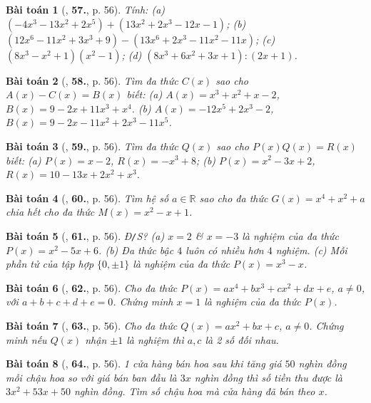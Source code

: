 \documentclass{article}
\numberwithin{equation}{section}
\newtheorem{baitoan}{Bài toán}
\begin{document}
\begin{baitoan}[\cite{SBT_Toan_7_Canh_Dieu_tap_2}, \textbf{57.}, p. 56]
	Tính: (a) $(-4x^3 - 13x^2 + 2x^5) + (13x^2 + 2x^3 - 12x - 1)$; (b) $(12x^6 - 11x^2 + 3x^3 + 9) - (13x^6 + 2x^3 - 11x^2 - 11x)$; (c) $(8x^3 - x^2 + 1)(x^2 - 1)$; (d) $(8x^3 + 6x^2 + 3x + 1):(2x + 1)$.
\end{baitoan}

\begin{baitoan}[\cite{SBT_Toan_7_Canh_Dieu_tap_2}, \textbf{58.}, p. 56]
	Tìm đa thức $C(x)$ sao cho $A(x) - C(x) = B(x)$ biết: (a) $A(x) = x^3 + x^2 + x - 2$, $B(x) = 9 - 2x + 11x^3 + x^4$. (b) $A(x) = -12x^5 + 2x^3 - 2$, $B(x) = 9 - 2x - 11x^2 + 2x^3 - 11x^5$.
\end{baitoan}

\begin{baitoan}[\cite{SBT_Toan_7_Canh_Dieu_tap_2}, \textbf{59.}, p. 56]
	Tìm đa thức $Q(x)$ sao cho $P(x)Q(x) = R(x)$ biết: (a) $P(x) = x - 2$, $R(x) = -x^3 + 8$; (b) $P(x) = x^2 - 3x + 2$, $R(x) = 10 - 13x + 2x^2 + x^3$.
\end{baitoan}

\begin{baitoan}[\cite{SBT_Toan_7_Canh_Dieu_tap_2}, \textbf{60.}, p. 56]
	Tìm hệ số $a\in\mathbb{R}$ sao cho đa thức $G(x) = x^4 + x^2 + a$ chia hết cho đa thức $M(x) = x^2 - x + 1$.
\end{baitoan}

\begin{baitoan}[\cite{SBT_Toan_7_Canh_Dieu_tap_2}, \textbf{61.}, p. 56]
	\emph{Đ\texttt{/}S?} (a) $x = 2$ \& $x = -3$ là nghiệm của đa thức $P(x) = x^2 - 5x + 6$. (b) Đa thức bậc $4$ luôn có nhiều hơn $4$ nghiệm. (c) Mỗi phần tử của tập hợp $\{0,\pm1\}$ là nghiệm của đa thức $P(x) = x^3 - x$.
\end{baitoan}

\begin{baitoan}[\cite{SBT_Toan_7_Canh_Dieu_tap_2}, \textbf{62.}, p. 56]
	Cho đa thức $P(x) = ax^4 + bx^3 + cx^2 + dx + e$, $a\ne0$, với $a + b + c + d + e = 0$. Chứng minh $x = 1$ là nghiệm của đa thức $P(x)$.
\end{baitoan}

\begin{baitoan}[\cite{SBT_Toan_7_Canh_Dieu_tap_2}, \textbf{63.}, p. 56]
	Cho đa thức $Q(x) = ax^2 + bx + c$, $a\ne0$. Chứng minh nếu $Q(x)$ nhận $\pm1$ là nghiệm thì $a,c$ là 2 số đối nhau.
\end{baitoan}

\begin{baitoan}[\cite{SBT_Toan_7_Canh_Dieu_tap_2}, \textbf{64.}, p. 56]
	1 cửa hàng bán hoa sau khi tăng giá $50$ nghìn đồng mỗi chậu hoa so với giá bán ban đầu là $3x$ nghìn đồng thì số tiền thu được là $3x^2 + 53x + 50$ nghìn đồng. Tìm số chậu hoa mà cửa hàng đã bán theo $x$.
\end{baitoan}
\end{document}
